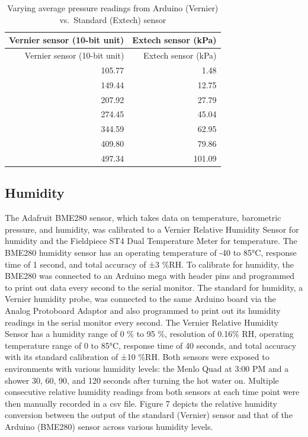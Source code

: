 \documentclass[12pt,]{article}
\begin{document}
\begin{longtable}[]{@{}rr@{}}
\caption{Varying average pressure readings from Arduino (Vernier)
vs.~Standard (Extech) sensor}\tabularnewline
\toprule
Vernier sensor (10-bit unit) & Extech sensor (kPa)\tabularnewline
\midrule
\endfirsthead
\toprule
Vernier sensor (10-bit unit) & Extech sensor (kPa)\tabularnewline
\midrule
\endhead
105.77 & 1.48\tabularnewline
149.44 & 12.75\tabularnewline
207.92 & 27.79\tabularnewline
274.45 & 45.04\tabularnewline
344.59 & 62.95\tabularnewline
409.80 & 79.86\tabularnewline
497.34 & 101.09\tabularnewline
\bottomrule
\end{longtable}

\subsection{Humidity}\label{humidity}

The Adafruit BME280 sensor, which takes data on temperature, barometric
pressure, and humidity, was calibrated to a Vernier Relative Humidity
Sensor for humidity and the Fieldpiece ST4 Dual Temperature Meter for
temperature. The BME280 humidity sensor has an operating temperature of
-40 to 85°C, response time of 1 second, and total accuracy of ±3 \%RH.
To calibrate for humidity, the BME280 was connected to an Arduino mega
with header pins and programmed to print out data every second to the
serial monitor. The standard for humidity, a Vernier humidity probe, was
connected to the same Arduino board via the Analog Protoboard Adaptor
and also programmed to print out its humidity readings in the serial
monitor every second. The Vernier Relative Humidity Sensor has a
humidity range of 0 \% to 95 \%, resolution of 0.16\% RH, operating
temperature range of 0 to 85°C, response time of 40 seconds, and total
accuracy with its standard calibration of ±10 \%RH. Both sensors were
exposed to environments with various humidity levels: the Menlo Quad at
3:00 PM and a shower 30, 60, 90, and 120 seconds after turning the hot
water on. Multiple consecutive relative humidity readings from both
sensors at each time point were then manually recorded in a csv file.
Figure 7 depicts the relative humidity conversion between the output of
the standard (Vernier) sensor and that of the Arduino (BME280) sensor
across various humidity levels.
\end{document}
